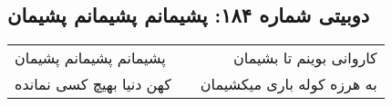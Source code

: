\begin{center}
\section*{دوبیتی شماره ۱۸۴: پشیمانم پشیمانم پشیمان}
\label{sec:184}
\begin{longtable}{l p{0.5cm} r}
پشیمانم پشیمانم پشیمان
&&
کاروانی بوینم تا بشیمان
\\
کهن دنیا بهیچ کسی نمانده
&&
به هرزه کوله باری میکشیمان
\\
\end{longtable}
\end{center}
